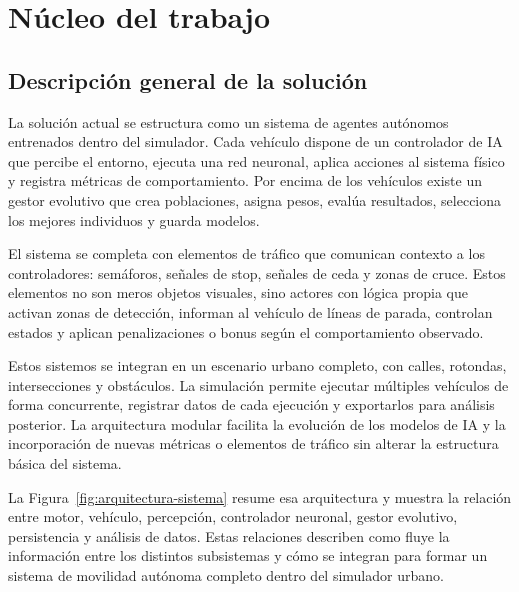 \chapter{Núcleo del trabajo}

\section{Descripción general de la solución}

La solución actual se estructura como un sistema de agentes autónomos entrenados dentro del simulador. Cada vehículo dispone de un controlador de IA que percibe el entorno, ejecuta una red neuronal, aplica acciones al sistema físico y registra métricas de comportamiento. Por encima de los vehículos existe un gestor evolutivo que crea poblaciones, asigna pesos, evalúa resultados, selecciona los mejores individuos y guarda modelos.

El sistema se completa con elementos de tráfico que comunican contexto a los controladores: semáforos, señales de stop, señales de ceda y zonas de cruce. Estos elementos no son meros objetos visuales, sino actores con lógica propia que activan zonas de detección, informan al vehículo de líneas de parada, controlan estados y aplican penalizaciones o bonus según el comportamiento observado.

Estos sistemos se integran en un escenario urbano completo, con calles, rotondas, intersecciones y obstáculos. La simulación permite ejecutar múltiples vehículos de forma concurrente, registrar datos de cada ejecución y exportarlos para análisis posterior. La arquitectura modular facilita la evolución de los modelos de IA y la incorporación de nuevas métricas o elementos de tráfico sin alterar la estructura básica del sistema.

\clearpage
La Figura~\ref{fig:arquitectura-sistema} resume esa arquitectura y muestra la relación entre motor, vehículo, percepción, controlador neuronal, gestor evolutivo, persistencia y análisis de datos. Estas relaciones describen como fluye la información entre los distintos subsistemas y cómo se integran para formar un sistema de movilidad autónoma completo dentro del simulador urbano.

